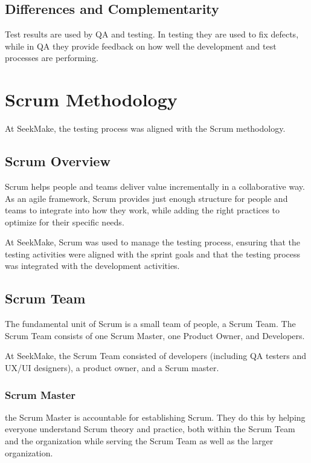 \subsection{Differences and Complementarity}

Test results are used by QA and testing. In testing they are used to fix defects, while in QA they provide
feedback on how well the development and test processes are performing. \cite{istqbctfl4.0.1}

\section{Scrum Methodology}

At SeekMake, the testing process was aligned with the Scrum methodology.

\subsection{Scrum Overview}

Scrum helps people and teams deliver value incrementally in a collaborative way. As an agile framework, Scrum provides just enough structure for people and teams to integrate into how they work, while adding the right practices to optimize for their specific needs. \cite{scrum}

At SeekMake, Scrum was used to manage the testing process, ensuring that the testing activities were aligned with the sprint goals and that the testing process was integrated with the development activities.
\subsection{Scrum Team}

The fundamental unit of Scrum is a small team of people, a Scrum Team. The Scrum Team consists of one Scrum Master, one Product Owner, and Developers. \cite{scrum}

At SeekMake, the Scrum Team consisted of developers (including QA testers and UX/UI designers), a product owner, and a Scrum master.
\subsubsection{Scrum Master}

the Scrum Master is accountable for establishing Scrum. They do this by helping everyone understand Scrum theory and practice, both within the Scrum Team and the organization while serving the Scrum Team as well as the larger organization. \cite{scrum}

